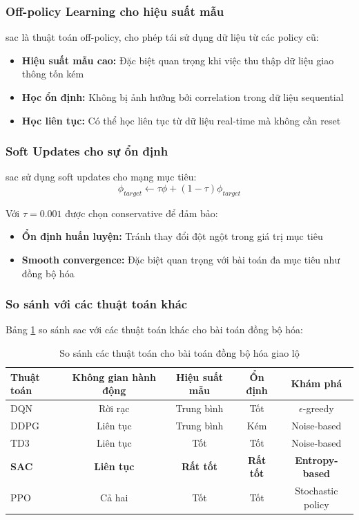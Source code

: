 \subsubsection{Off-policy Learning cho hiệu suất mẫu}
\ac{sac} là thuật toán off-policy, cho phép tái sử dụng dữ liệu từ các policy cũ:
\begin{itemize}
    \item \textbf{Hiệu suất mẫu cao:} Đặc biệt quan trọng khi việc thu thập dữ liệu giao thông tốn kém
    \item \textbf{Học ổn định:} Không bị ảnh hưởng bởi correlation trong dữ liệu sequential
    \item \textbf{Học liên tục:} Có thể học liên tục từ dữ liệu real-time mà không cần reset
\end{itemize}

\subsubsection{Soft Updates cho sự ổn định}
\ac{sac} sử dụng soft updates cho mạng mục tiêu:
\begin{equation}
    \phi_{target} \leftarrow \tau \phi + (1-\tau) \phi_{target}
\end{equation}

Với $\tau = 0.001$ được chọn conservative để đảm bảo:
\begin{itemize}
    \item \textbf{Ổn định huấn luyện:} Tránh thay đổi đột ngột trong giá trị mục tiêu
    \item \textbf{Smooth convergence:} Đặc biệt quan trọng với bài toán đa mục tiêu như đồng bộ hóa
\end{itemize}

\subsubsection{So sánh với các thuật toán khác}
Bảng \ref{tab:algorithm_comparison} so sánh \ac{sac} với các thuật toán khác cho bài toán đồng bộ hóa:

\begin{table}[!htp]
\centering
\caption{So sánh các thuật toán cho bài toán đồng bộ hóa giao lộ}
\label{tab:algorithm_comparison}
\begin{tabular}{|l|c|c|c|c|}
\hline
\textbf{Thuật toán} & \textbf{Không gian hành động} & \textbf{Hiệu suất mẫu} & \textbf{Ổn định} & \textbf{Khám phá} \\
\hline
DQN & Rời rạc & Trung bình & Tốt & $\epsilon$-greedy \\
\hline
DDPG & Liên tục & Trung bình & Kém & Noise-based \\
\hline
TD3 & Liên tục & Tốt & Tốt & Noise-based \\
\hline
\textbf{SAC} & \textbf{Liên tục} & \textbf{Rất tốt} & \textbf{Rất tốt} & \textbf{Entropy-based} \\
\hline
PPO & Cả hai & Tốt & Tốt & Stochastic policy \\
\hline
\end{tabular}
\end{table}

